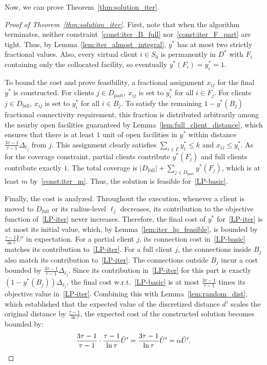 Now, we can prove Theorem~\ref{thm:solution_iter}.
\begin{proof}[Proof of Theorem~\ref{thm:solution_iter}]
First, note that when the algorithm terminates, neither constraint~\eqref{const:iter_B_full} nor~\eqref{const:iter_F_part} are tight. Thus, by Lemma~\ref{lem:iter_almost_integral}, $y^*$ has at most two strictly fractional values. Also, every virtual client $i \in S_0$ is permanently in $D^*$ with $F_i$ containing only the collocated facility, so eventually $y^*(F_i) = y^*_i = 1$.

To bound the cost and prove feasibility, a fractional assignment $x_{ij}$ for the final $y^*$ is constructed. For clients $j \in D_\text{part}$, $x_{ij}$ is set to $y^*_i$ for all $i \in F_j$. For clients $j \in D_\text{full}$, $x_{ij}$ is set to $y^*_i$ for all $i \in B_j$. To satisfy the remaining $1 - y^*(B_j)$ fractional connectivity requirement, this fraction is distributed arbitrarily among the nearby open facilities guaranteed by Lemma~\ref{lem:full_client_distance}, which ensures that there is at least $1$ unit of open facilities in $y^*$ within distance $\frac{3\tau-1}{\tau-1}\Delta_{\ell_j}$ from $j$. This assignment clearly satisfies $\sum_{i \in F} y^*_i \le k$ and $x_{ij} \le y^*_i$. As for the coverage constraint, partial clients contribute $y^*(F_j)$ and full clients contribute exactly $1$. The total coverage is $|D_\text{full}| + \sum_{j \in D_\text{part}} y^*(F_j)$, which is at least $m$ by~\eqref{const:iter_m}. Thus, the solution is feasible for~\eqref{LP-basic}.

Finally, the cost is analyzed. Throughout the execution, whenever a client is moved to $D_\text{full}$ or its radius-level $\ell_j$ decreases, its contribution to the objective function of~\eqref{LP-iter} never increases. Therefore, the final cost of $y^*$ for~\eqref{LP-iter} is at most its initial value, which, by Lemma~\ref{lem:iter_lp_feasible}, is bounded by $\frac{\tau-1}{\ln \tau} \tilde{U}'$ in expectation. For a partial client $j$, its connection cost in~\eqref{LP-basic} matches its contribution to~\eqref{LP-iter}. For a full client $j$, the connections inside $B_j$ also match its contribution to~\eqref{LP-iter}. The connections outside $B_j$ incur a cost bounded by $\frac{3\tau-1}{\tau-1}\Delta_{\ell_j}$. Since its contribution in~\eqref{LP-iter} for this part is exactly $(1-y^*(B_j))\Delta_{\ell_j}$, the final cost w.r.t.~\eqref{LP-basic} is at most $\frac{3\tau-1}{\tau-1}$ times its objective value in~\eqref{LP-iter}. Combining this with Lemma~\ref{lem:random_dist}, which established that the expected value of the discretized distance $d'$ scales the original distance by $\frac{\tau-1}{\ln \tau}$, the expected cost of the constructed solution becomes bounded by:
\[ \frac{3\tau-1}{\tau-1} \cdot \frac{\tau-1}{\ln \tau} \tilde{U}' = \frac{3\tau-1}{\ln \tau} \tilde{U}' = \alpha \tilde{U}'. \qedhere \]
\end{proof}

